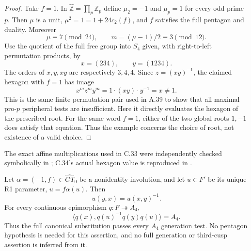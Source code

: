 \begin{proof}
Take $f=1$. In $\widehat{\mathbb Z}=\prod_p\mathbb Z_p$ define
$\mu_2=-1$ and $\mu_p=1$ for every odd prime $p$. Then $\mu$ is a
unit, $\mu^2=1=1+24c_2(f)$, and $f$ satisfies the full pentagon
and duality. Moreover
\[
 \mu\equiv7\pmod{24},\qquad m=(\mu-1)/2\equiv3\pmod{12}.
\]
Use the quotient of the full free group into $S_4$ given, with
right-to-left permutation products, by
\[
                     x=(234),\qquad y=(1234).
\]
The orders of $x,y,xy$ are respectively $3,4,4$. Since
$z=(xy)^{-1}$, the claimed hexagon with $f=1$ has image
\[
             x^m z^m y^m=1\cdot(xy)\cdot y^{-1}=x\ne1.
\]
This is the same finite permutation pair used in A.39 to show that
all maximal pro-$p$ peripheral tests are insufficient. Here it
directly evaluates the hexagon of the prescribed root.
For the same word $f=1$, either of the two global roots $1,-1$
does satisfy that equation. Thus the example concerns the choice
of root, not existence of a valid choice.
\end{proof}

The exact affine multiplications used in C.33 were independently
checked symbolically in
; C.34's actual
hexagon value is reproduced in
.

Let \(\alpha=(-1,f)\in\widehat{GT}_0\) be a nonidentity
involution, and let \(u\in F'\) be its unique R1 parameter,
\(u=f\alpha(u)\). Then
\[
                         u(y,x)=u(x,y)^{-1}.
 \tag{C.35.1}
\]
For every continuous epimorphism \(q:F\twoheadrightarrow A_4\),
\[
           \big\langle q(x),q(u)^{-1}q(y)q(u)\big\rangle=A_4.
 \tag{C.35.2}
\]
Thus the full canonical substitution passes every \(A_4\) generation
test. No pentagon hypothesis is needed for this assertion, and no
full generation or third-cusp assertion is inferred from it.

